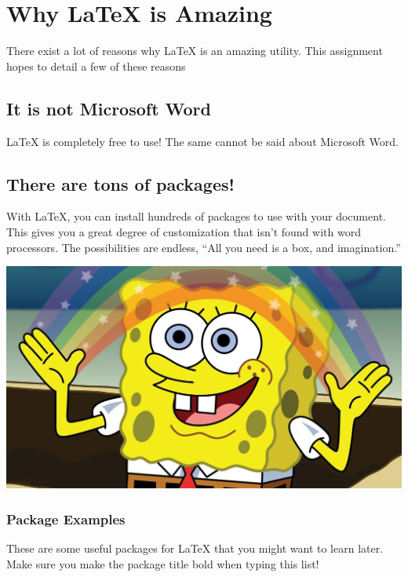 \section{Why LaTeX is Amazing}

There exist a lot of reasons why LaTeX is an amazing utility. This assignment hopes to detail a few of these reasons

\subsection{It is not Microsoft Word}

LaTeX is completely free to use! The same cannot be said about Microsoft Word.

\subsection{There are tons of packages!}

With LaTeX, you can install hundreds of packages to use with your document. This gives you a great degree of customization that isn't found with word processors. The possibilities are endless, ``All you need is a box, and imagination.''

\begin{center}
\includegraphics[scale=0.17]{imagination.png}
\end{center}

\subsubsection{Package Examples}

These are some useful packages for LaTeX that you might want to learn later. Make sure you make the package title bold when typing this list!

